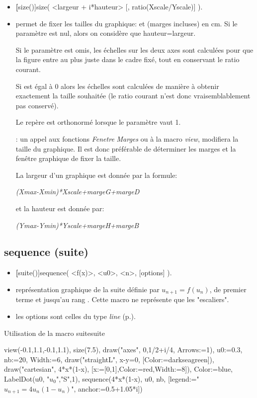 \begin{itemize}
 \item \util \textbf[size()]{size( <largeur + i*hauteur> [, ratio(Xscale/Yscale)] )}.
 \item \desc permet de fixer les tailles du graphique:  et  (marges incluses) en cm. Si le paramètre  est nul, alors on considère que hauteur=largeur.

 Si le paramètre  est omis, les échelles sur les deux axes sont calculées pour que la figure entre au plus juste dans le cadre fixé, tout en conservant le ratio courant.

 Si  est égal à $0$ alors les échelles sont calculées de manière à obtenir exactement la taille souhaitée (le ratio courant n'est donc vraisemblablement pas conservé).

 Le repère est orthonormé lorsque le paramètre  vaut 1. 

 : un appel aux fonctions \textsl{Fenetre} \textsl{Marges} ou à la macro \textsl{view}, modifiera la taille du graphique. Il est donc préférable de déterminer les marges et la fenêtre graphique  de fixer la taille.

 La largeur d'un graphique est donnée par la formule: 

\centerline{\textsl{(Xmax-Xmin)*Xscale+margeG+margeD}}

 et la hauteur est donnée par:

\centerline{\textsl{(Ymax-Ymin)*Yscale+margeH+margeB}}
\end{itemize}

\subsection{sequence (suite)}

\begin{itemize}
 \item \util \textbf[suite()]{sequence( <f(x)>, <u0>, <n>, [options] )}.
 \item \desc représentation graphique de la suite définie par $u_{n+1}=f(u_n)$, de premier terme  et jusqu'au rang . Cette macro ne représente que les "escaliers".
 \item les options sont celles du type \emph{line} (p.\pageref{typeline}).
\end{itemize}


\begin{demo}{Utilisation de la macro suite}{suite}
\begin{texgraph}[name=suite]
view(-0.1,1.1,-0.1,1.1), size(7.5),
draw("axes", 0,1/2+i/4, Arrows:=1),
u0:=0.3, nb:=20, Width:=6,
draw("straightL", x-y=0, [Color:=darkseagreen]),
draw("cartesian", 4*x*(1-x), [x:=[0,1],Color:=red,Width:=8]),
Color:=blue, LabelDot(u0, "$u_0$","S",1),
sequence(4*x*(1-x), u0, nb, [legend:="$u_{n+1}=4u_n(1-u_n)$",
 anchor:=0.5+1.05*i])
\end{texgraph}
\end{demo}

